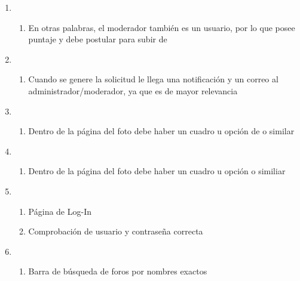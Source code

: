 \documentclass[12pt, letterpaper, notitlepage]{article}
\begin{document}
\begin{enumerate}
		\item {}
		\begin{enumerate}
			\item En otras palabras, el moderador también es un usuario, por lo que posee puntaje y debe postular para subir de 
		\end{enumerate}

	\item {}
		\begin{enumerate}
			\item Cuando se genere la solicitud le llega una notificación y un correo al administrador/moderador, ya que es de mayor relevancia
		\end{enumerate}
		
		   \item {}
       	\begin{enumerate}
			\item Dentro de la página del foto debe haber un cuadro u opción de  o similar
		\end{enumerate}
		
		   \item {}
       	\begin{enumerate}
			\item Dentro de la página del foto debe haber un cuadro u opción  o similiar
		\end{enumerate}
		
	\item {}
		\begin{enumerate}
			\item Página de Log-In
			\item Comprobación de usuario y contraseña correcta
		\end{enumerate}
		
	\item {}
    	\begin{enumerate}
			\item Barra de búsqueda de foros por nombres exactos
		\end{enumerate}
		

\end{enumerate}
\end{document}
